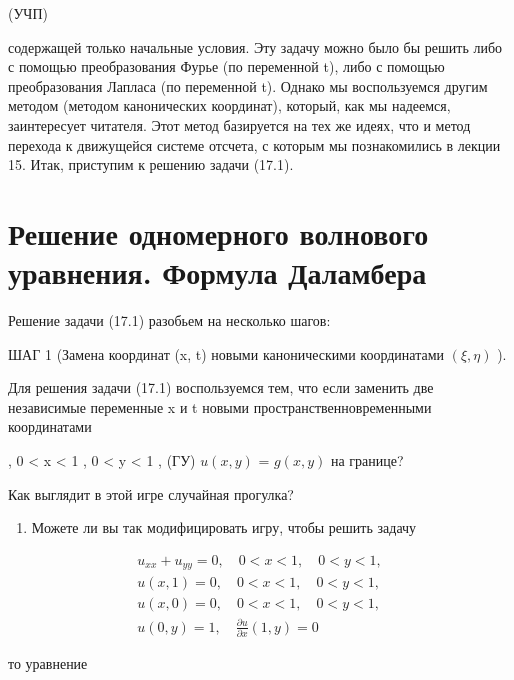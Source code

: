 \documentclass[
  ukrainian,
]{article}
\providecommand{\tightlist}{%
  \setlength{\itemsep}{0pt}\setlength{\parskip}{0pt}}
\begin{document}
(УЧП)

содержащей только начальные условия. Эту задачу можно было бы решить
либо с помощью преобразования Фурье (по переменной t), либо с помощью
преобразования Лапласа (по переменной t). Однако мы воспользуемся другим
методом (методом канонических координат), который, как мы надеемся,
заинтересует читателя. Этот метод базируется на тех же идеях, что и
метод перехода к движущейся системе отсчета, с которым мы познакомились
в лекции 15. Итак, приступим к решению задачи (17.1).

\section{Решение одномерного волнового уравнения. Формула
Даламбера}\label{ux440ux435ux448ux435ux43dux438ux435-ux43eux434ux43dux43eux43cux435ux440ux43dux43eux433ux43e-ux432ux43eux43bux43dux43eux432ux43eux433ux43e-ux443ux440ux430ux432ux43dux435ux43dux438ux44f.-ux444ux43eux440ux43cux443ux43bux430-ux434ux430ux43bux430ux43cux431ux435ux440ux430}

Решение задачи (17.1) разобьем на несколько шагов:

ШАГ 1 (Замена координат (x, t) новыми каноническими координатами
\((\xi, \eta)\) ).

Для решения задачи (17.1) воспользуемся тем, что если заменить две
независимые переменные x и t новыми пространственновременными
координатами

, 0 \textless{} x \textless{} 1 , 0 \textless{} y \textless{} 1 , (ГУ)
\(u(x, y)\) = \(g(x, y)\) на границе?

Как выглядит в этой игре случайная прогулка?

\begin{enumerate}
\def\labelenumi{\arabic{enumi}.}
\setcounter{enumi}{3}
\tightlist
\item
  Можете ли вы так модифицировать игру, чтобы решить задачу
\end{enumerate}

\[
\begin{array}{l} u_{xx} + u_{yy} = 0, \quad 0 < x < 1, \quad 0 < y < 1, \\ u(x, 1) = 0, \quad 0 < x < 1, \quad 0 < y < 1, \\ u(x, 0) = 0, \quad 0 < x < 1, \quad 0 < y < 1, \\ u(0, y) = 1, \quad \frac{\partial u}{\partial x}(1, y) = 0 \end{array}
\]

то уравнение
\end{document}
